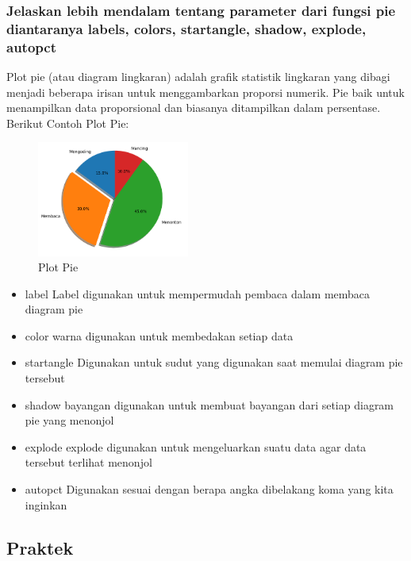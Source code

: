 \subsubsection{Jelaskan lebih mendalam tentang parameter dari fungsi pie diantaranya labels, colors, startangle, shadow, explode, autopct}
\hfill \break
Plot pie (atau diagram lingkaran) adalah grafik statistik lingkaran yang dibagi menjadi beberapa irisan untuk menggambarkan proporsi numerik. Pie baik untuk menampilkan data proporsional dan biasanya ditampilkan  dalam persentase.
Berikut Contoh Plot Pie:

\begin{figure}[H]	
    \includegraphics[width=5cm]{figures/6/1174074/Teori/plot_pie.png}
    \centering
    \caption{Plot Pie}
\end{figure}
\begin{itemize}
    \item label
    Label digunakan untuk mempermudah pembaca dalam membaca diagram pie
    \item color
    warna digunakan untuk membedakan setiap data
    \item startangle
    Digunakan untuk sudut yang digunakan saat memulai diagram pie tersebut
    \item shadow
    bayangan digunakan untuk membuat bayangan dari setiap diagram pie yang menonjol
    \item explode
    explode digunakan untuk mengeluarkan suatu data agar data tersebut terlihat menonjol
    \item autopct
    Digunakan sesuai dengan berapa angka dibelakang koma yang kita inginkan
\end{itemize}
\subsection{Praktek}
